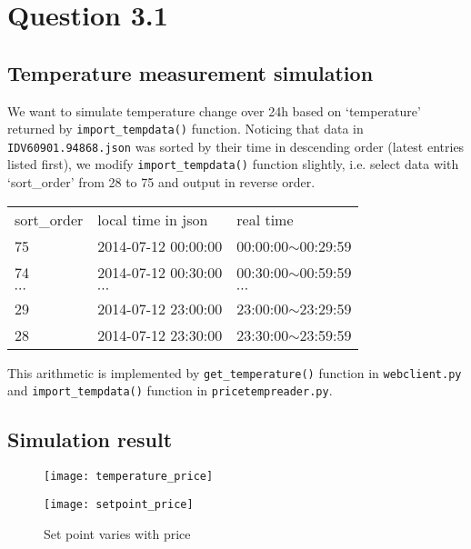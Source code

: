 \documentclass{article}
\newenvironment{homeworkProblem}[1]{
	\section*{#1}
	}{
}
\newenvironment{homeworkSection}[1]{
	\subsection*{#1}
	}{
}
\begin{document}
\begin{homeworkProblem}{Question 3.1}

\begin{homeworkSection}{Temperature measurement simulation}

We want to simulate temperature change over 24h based on `temperature' returned by \texttt{import\_tempdata()} function. Noticing that data in \texttt{IDV60901.94868.json} was sorted by their time in descending order (latest entries listed first), we modify \texttt{import\_tempdata()} function slightly, i.e. select data with `sort\_order' from 28 to 75 and output in reverse order.
\begin{table}[!hbp]
\centering
\begin{tabu} to 0.8\textwidth {X[c] X[l] X[l]}
sort\_order &local time in json &real time\\
75 & 2014-07-12 00:00:00 & 00:00:00$\sim$00:29:59 \\
74 & 2014-07-12 00:30:00 & 00:30:00$\sim$00:59:59 \\
$\cdots$ &$\cdots$ &$\cdots$\\
29 & 2014-07-12 23:00:00 & 23:00:00$\sim$23:29:59 \\
28 & 2014-07-12 23:30:00 & 23:30:00$\sim$23:59:59
\end{tabu}
\end{table}

This arithmetic is implemented by \texttt{get\_temperature()} function in \texttt{webclient.py} and \texttt{import\_tempdata()} function in \texttt{pricetempreader.py}.
\end{homeworkSection}


\begin{homeworkSection}{Simulation result}
\begin{figure}[H]
\begin{minipage}[t]{0.5\linewidth}
\centering
\texttt{[image: temperature\_price]}
\caption{Price and temperature over 24h}
\label{temperature_price}
\end{minipage}
\begin{minipage}[t]{0.5\linewidth}
\centering
\texttt{[image: setpoint\_price]}
\caption{Set point varies with price}
\label{setpoint_price}
\end{minipage}
\end{figure}
\end{homeworkSection}



\end{homeworkProblem}
\end{document}
